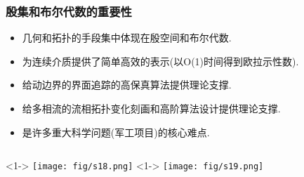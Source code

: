 \documentclass[UTF8]{ctexbeamer}	%
\theoremstyle{plain}
\theoremstyle{definition}
\theoremstyle{remark}
\numberwithin{equation}{section}
\begin{document}
\begin{frame}
    \frametitle{殷集和布尔代数的重要性}
    \begin{itemize}
        \item 几何和拓扑的手段集中体现在殷空间和布尔代数.
        \item 为连续介质提供了简单高效的表示(以O(1)时间得到欧拉示性数).
        \item 给动边界的界面追踪的高保真算法提供理论支撑.
        \item 给多相流的流相拓扑变化刻画和高阶算法设计提供理论支撑.
        \item 是许多重大科学问题(军工项目)的核心难点.
    \end{itemize}

    \begin{columns}
        <1->
        \centering
        \texttt{[image: fig/s18.png]}
        <1->
        \centering
        \texttt{[image: fig/s19.png]}
    \end{columns}

\end{frame}
\end{document}
